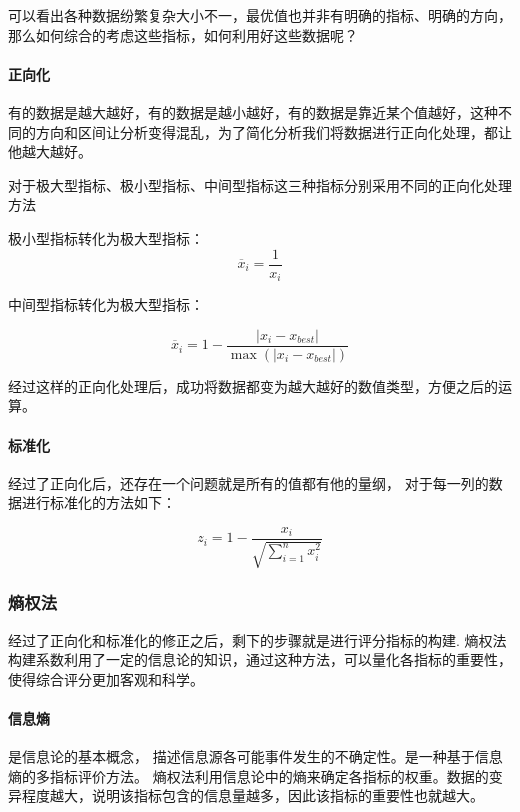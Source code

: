 \documentclass[withoutpreface,bwprint]{cumcmthesis} %
\begin{document}
可以看出各种数据纷繁复杂大小不一，最优值也并非有明确的指标、明确的方向，那么如何综合的考虑这些指标，如何利用好这些数据呢？

\paragraph*{正向化}有的数据是越大越好，有的数据是越小越好，有的数据是靠近某个值越好，这种不同的方向和区间让分析变得混乱，为了简化分析我们将数据进行正向化处理，都让他越大越好。

对于极大型指标、极小型指标、中间型指标这三种指标分别采用不同的正向化处理方法

极小型指标转化为极大型指标：
\begin{equation}
    \overline{x}_i = \frac{1}{x_{i}}  
\end{equation}

中间型指标转化为极大型指标：

\begin{equation}
    \overline{x}_i = 1- \frac{\left\lvert x_i - x_{best}\right\rvert }{\max({\left\lvert x_i - x_{best}\right\rvert} ) }
\end{equation}


经过这样的正向化处理后，成功将数据都变为越大越好的数值类型，方便之后的运算。


\paragraph*{标准化}经过了正向化后，还存在一个问题就是所有的值都有他的量纲，
对于每一列的数据进行标准化的方法如下：

\begin{equation}
    z_i = 1- \frac{x_i}{ \sqrt{\sum_{i=1}^n x_{i}^2} } 
\end{equation}

\subsubsection{熵权法}

经过了正向化和标准化的修正之后，剩下的步骤就是进行评分指标的构建.
熵权法构建系数利用了一定的信息论的知识，通过这种方法，可以量化各指标的重要性，使得综合评分更加客观和科学。

\paragraph*{信息熵}是信息论的基本概念， 描述信息源各可能事件发生的不确定性。是一种基于信息熵的多指标评价方法。
熵权法利用信息论中的熵来确定各指标的权重。数据的变异程度越大，说明该指标包含的信息量越多，因此该指标的重要性也就越大。
\end{document}
